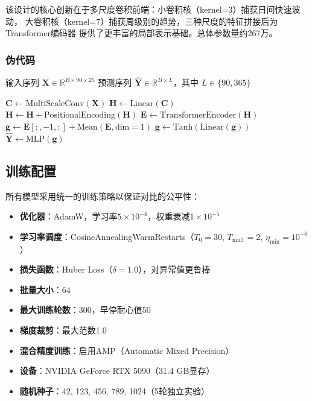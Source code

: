 \documentclass[12pt,a4paper]{ctexart}
\begin{document}
该设计的核心创新在于多尺度卷积前端：小卷积核（kernel=3）捕获日间快速波动，
大卷积核（kernel=7）捕获周级别的趋势，三种尺度的特征拼接后为Transformer编码器
提供了更丰富的局部表示基础。总体参数量约267万。

\subsubsection{伪代码}

\begin{algorithm}[H]
\caption{CNN-Transformer前向传播}
\begin{algorithmic}[1]
\Require 输入序列 $\mathbf{X} \in \mathbb{R}^{B \times 90 \times 25}$
\Ensure 预测序列 $\hat{\mathbf{Y}} \in \mathbb{R}^{B \times L}$，其中 $L \in \{90, 365\}$

\State $\mathbf{C} \gets \text{MultiScaleConv}(\mathbf{X})$
\State $\mathbf{H} \gets \text{Linear}(\mathbf{C})$
\State $\mathbf{H} \gets \mathbf{H} + \text{PositionalEncoding}(\mathbf{H})$
\State $\mathbf{E} \gets \text{TransformerEncoder}(\mathbf{H})$
\State $\mathbf{g} \gets \mathbf{E}[:,-1,:] + \text{Mean}(\mathbf{E}, \text{dim}=1)$
\State $\mathbf{g} \gets \text{Tanh}(\text{Linear}(\mathbf{g}))$
\State $\hat{\mathbf{Y}} \gets \text{MLP}(\mathbf{g})$

\end{algorithmic}
\end{algorithm}

\subsection{训练配置}

所有模型采用统一的训练策略以保证对比的公平性：
\begin{itemize}[nosep]
    \item \textbf{优化器}：AdamW，学习率$5\times10^{-4}$，权重衰减$1\times10^{-5}$
    \item \textbf{学习率调度}：CosineAnnealingWarmRestarts（$T_0=30$, $T_{\text{mult}}=2$, $\eta_{\text{min}}=10^{-6}$）
    \item \textbf{损失函数}：Huber Loss（$\delta=1.0$），对异常值更鲁棒
    \item \textbf{批量大小}：64
    \item \textbf{最大训练轮数}：300，早停耐心值50
    \item \textbf{梯度裁剪}：最大范数1.0
    \item \textbf{混合精度训练}：启用AMP（Automatic Mixed Precision）
    \item \textbf{设备}：NVIDIA GeForce RTX 5090（31.4 GB显存）
    \item \textbf{随机种子}：42, 123, 456, 789, 1024（5轮独立实验）
\end{itemize}
\end{document}
